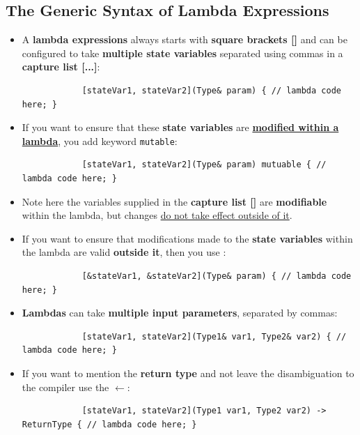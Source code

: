 \documentclass[10pt]{article}
\newcommand{\pbreak}{\vspace{30pt}}
\begin{document}
\subsection{The Generic Syntax of Lambda Expressions}
\begin{itemize}
	\item A \textbf{lambda expressions} always starts with \textbf{square brackets []} and can be configured to take \textbf{multiple state variables} separated using commas in a \textbf{capture list [...]}:

		\begin{verbatim}
			[stateVar1, stateVar2](Type& param) { // lambda code here; }
		\end{verbatim}

	\item If you want to ensure that these \textbf{state variables} are \textbf{\underline{modified within a lambda}}, you add keyword \verb|mutable|:
		\begin{verbatim}
			[stateVar1, stateVar2](Type& param) mutuable { // lambda code here; }
		\end{verbatim}

		\pbreak

	\item Note here the variables supplied in the \textbf{capture list []} are \textbf{modifiable} within the lambda, but changes \underline{do not take effect outside of it}.

	\item If you want to ensure that modifications made to the \textbf{state variables} within the lambda are valid \textbf{outside it}, then you use :
		\begin{verbatim}
			[&stateVar1, &stateVar2](Type& param) { // lambda code here; }
		\end{verbatim}

		\pbreak

	\item \textbf{Lambdas} can take \textbf{multiple input parameters}, separated by commas:
		\begin{verbatim}
			[stateVar1, stateVar2](Type1& var1, Type2& var2) { // lambda code here; }
		\end{verbatim}

		\pbreak

	\item If you want to mention the \textbf{return type} and not leave the disambiguation to the compiler use the $\leftarrow$:
		\begin{verbatim}
			[stateVar1, stateVar2](Type1 var1, Type2 var2) -> ReturnType { // lambda code here; }
		\end{verbatim}


\end{itemize}
\end{document}
